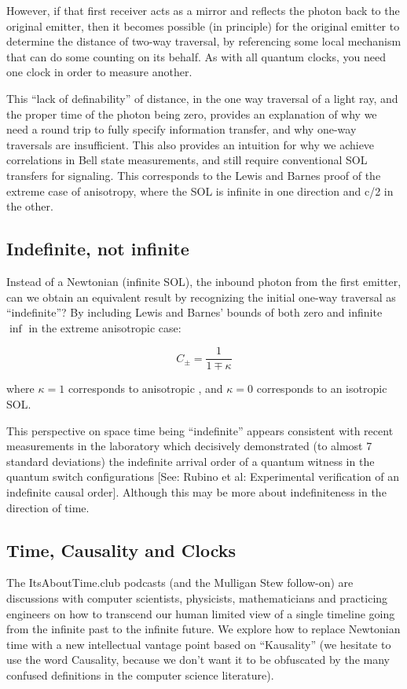 \documentclass[../../../OAE-SPEC-MAIN.tex]{subfiles}
\begin{document}
However, if that first receiver acts as a mirror and reflects the photon back to the original emitter, then it becomes possible (in principle) for the original emitter to determine the distance of two-way traversal, by referencing some local mechanism that can do some counting on its behalf. As with all quantum clocks, you need one clock in order to measure another. 

This “lack of definability” of distance, in the one way traversal of a light ray, and the proper time of the photon being zero, provides an explanation of why we need a round trip to fully specify information transfer, and why one-way traversals are insufficient.
This also provides an intuition for why we achieve correlations in Bell state measurements, and still require conventional SOL transfers for signaling. This corresponds to the Lewis and Barnes proof of the extreme case of anisotropy, where the SOL is infinite in one direction and c/2 in the other.


\subsection{Indefinite, not infinite}
Instead of a Newtonian (infinite SOL), the inbound photon from the first emitter, can we obtain an equivalent result by recognizing the initial one-way traversal as “indefinite”? By including Lewis and Barnes’ bounds of both zero and infinite \(\inf\) in the extreme anisotropic case:

\[
C_{\pm} = \frac{1}{1 \mp \kappa}
\]

where $\kappa = 1$ corresponds to anisotropic , and $\kappa = 0$ corresponds to an isotropic SOL.

This perspective on space time being “indefinite” appears consistent with recent measurements in the laboratory which decisively demonstrated (to almost 7 standard deviations) the indefinite arrival order of a quantum witness in the quantum switch configurations [See: Rubino et al: Experimental verification of an indefinite causal order]. Although this may be more about indefiniteness in the direction of time.

\subsection{Time, Causality and Clocks}
The ItsAboutTime.club podcasts (and the Mulligan Stew follow-on) are discussions with computer scientists, physicists, mathematicians and practicing engineers on how to transcend our human limited view of a single timeline going from the infinite past to the infinite future. We explore how to replace Newtonian time with a new intellectual vantage point based on “Kausality” (we hesitate to use the word Causality, because we don’t want it to be obfuscated by the many confused definitions in the computer  science literature).
\end{document}
